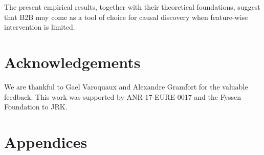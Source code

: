 \documentclass[preprint,12pt,3p]{elsarticle}
\begin{document}
The present empirical results, together with their theoretical foundations,
suggest that B2B may come as a tool of choice for causal discovery when
feature-wise intervention is limited.


\section{Acknowledgements}
We are thankful to Gael Varoquaux and Alexandre Gramfort for the valuable
feedback. This work was supported by ANR-17-EURE-0017 and the Fyssen Foundation
to JRK.




\newpage
\clearpage
\section{Appendices}

\end{document}
